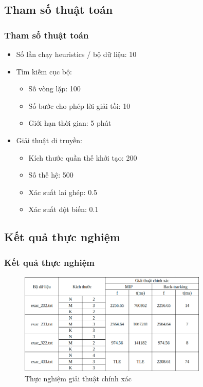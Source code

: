 \documentclass{beamer}
\begin{document}
	\subsection{Tham số thuật toán}
	\begin{frame}
	\frametitle{Tham số thuật toán}
		\begin{itemize}
			\item Số lần chạy heuristics / bộ dữ liệu: 10
			\item {
				Tìm kiếm cục bộ:
				\begin{itemize}
					\item Số vòng lặp: 100
					\item Số bước cho phép lời giải tồi: 10
					\item Giới hạn thời gian: 5 phút
				\end{itemize}
			}
			\item {
				Giải thuật di truyền:
				\begin{itemize}
					\item Kích thước quần thế khởi tạo: 200
					\item Số thế hệ: 500
					\item Xác suất lai ghép: 0.5
					\item Xác suất đột biến: 0.1
				\end{itemize}
			}
		\end{itemize}
	\end{frame}

	\subsection{Kết quả thực nghiệm}
	\begin{frame}
		\frametitle{Kết quả thực nghiệm}
		\begin{figure}
			\centering
			\caption{Thực nghiệm giải thuật chính xác}
			\includegraphics[width=0.8\textwidth]{images/exac.png}
		\end{figure}
	\end{frame}
\end{document}
